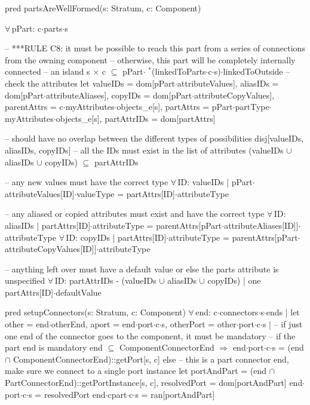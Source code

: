 pred partsAreWellFormed(s: Stratum, c: Component)
{
  $\forall\,$pPart: c$\cdot$parts$\cdot$s
  {
    -- ***RULE C8: it must be possible to reach this part from a series of connections from the owning component
    -- otherwise, this part will be completely internally connected -- an island
    s$\,\times\,$c $\subseteq$ pPart$\cdot$ $\!\!\!^\ast\!$(linkedToParts$\cdot$c$\cdot$s)$\cdot$linkedToOutside
    -- check the attributes
    let
      valueIDs = dom[pPart$\cdot$attributeValues],
      aliasIDs = dom[pPart$\cdot$attributeAliases],
      copyIDs = dom[pPart$\cdot$attributeCopyValues],
      parentAttrs = c$\cdot$myAttributes$\cdot$objects_e[s],
      partAttrs = pPart$\cdot$partType$\cdot$myAttributes$\cdot$objects_e[s],
      partAttrIDs = dom[partAttrs]
    {
      -- should have no overlap between the different types of possibilities
      disj[valueIDs, aliasIDs, copyIDs]
      -- all the IDs must exist in the list of attributes
      (valueIDs $\cup$ aliasIDs $\cup$ copyIDs) $\subseteq$ partAttrIDs

      -- any new values must have the correct type
      $\forall\,$ID: valueIDs |
        pPart$\cdot$attributeValues[ID]$\cdot$valueType = partAttrs[ID]$\cdot$attributeType

      -- any aliased or copied attributes must exist and have the correct type
      $\forall\,$ID: aliasIDs |
        partAttrs[ID]$\cdot$attributeType =
          parentAttrs[pPart$\cdot$attributeAliases[ID]]$\cdot$attributeType
      $\forall\,$ID: copyIDs |
        partAttrs[ID]$\cdot$attributeType =
          parentAttrs[pPart$\cdot$attributeCopyValues[ID]]$\cdot$attributeType
        
      -- anything left over must have a default value or else the parts attribute is unspecified
      $\forall\,$ID: partAttrIDs - (valueIDs $\cup$ aliasIDs $\cup$ copyIDs) |
        one partAttrs[ID]$\cdot$defaultValue
    }
  }  
} 


pred setupConnectors(s: Stratum, c: Component)
{
  $\forall\,$end: c$\cdot$connectors$\cdot$s$\cdot$ends |
  let other = end$\cdot$otherEnd, aport = end$\cdot$port$\cdot$c$\cdot$s, otherPort = other$\cdot$port$\cdot$c$\cdot$s |
  {
    -- if just one end of the connector goes to the component, it must be mandatory
    -- if the part end is mandatory
    end $\subseteq$ ComponentConnectorEnd $\Longrightarrow$
    {
      end$\cdot$port$\cdot$c$\cdot$s = (end $\cap$ ComponentConnectorEnd)::getPort[s, c]
    }
    else
    {
      -- this is a part connector end, make sure we connect to a single port instance
      let
        portAndPart = (end $\cap$ PartConnectorEnd)::getPortInstance[s, c],
        resolvedPort = dom[portAndPart]
        {
          end$\cdot$port$\cdot$c$\cdot$s = resolvedPort
          end$\cdot$cpart$\cdot$c$\cdot$s = ran[portAndPart]
        }
    }
  }
}

